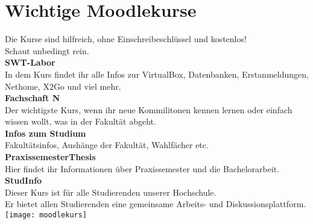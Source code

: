 \chapter{Wichtige Moodlekurse}

Die Kurse sind hilfreich, ohne Einschreibeschlüssel und kostenlos!\\
Schaut unbedingt rein.\\

\textbf{SWT-Labor}\\
In dem Kurs findet ihr alle Infos zur VirtualBox, Datenbanken, Erstanmeldungen, Nethome, X2Go und viel mehr.\\

\textbf{Fachschaft N}\\
Der wichtigste Kurs, wenn ihr neue Kommilitonen kennen lernen oder einfach wissen wollt, was in der Fakultät abgeht.\\

\textbf{Infos zum Studium}\\
Fakultätsinfos, Aushänge der Fakultät, Wahlfächer etc.\\ %

\textbf{PraxissemesterThesis}\\
Hier findet ihr Informationen über Praxissemester und die Bachelorarbeit.\\

\textbf{StudInfo}\\
Dieser Kurs ist für alle Studierenden unserer Hochschule.\\
Er bietet allen Studierenden eine gemeinsame Arbeits- und Diskussionsplattform.\\


\texttt{[image: moodlekurs]}